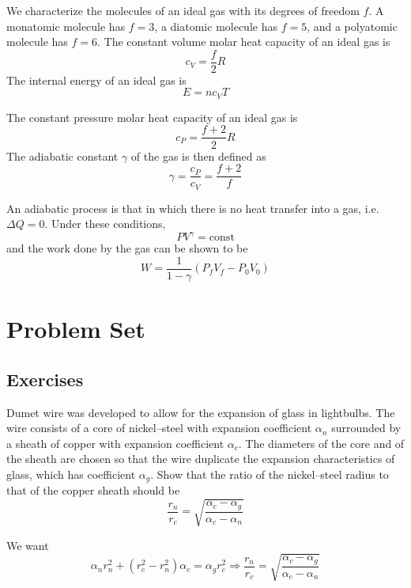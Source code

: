 \documentclass[11pt]{scrartcl}
\begin{document}
\begin{defn}
    We characterize the molecules of an ideal gas with its degrees of freedom $f$. A monatomic molecule has $f=3$, a diatomic molecule has $f=5$, and a polyatomic molecule has $f=6$. The constant volume molar heat capacity of an ideal gas is $$c_V=\frac{f}{2}R$$The internal energy of an ideal gas is $$E=nc_VT$$
\end{defn}

\begin{defn}
    The constant pressure molar heat capacity of an ideal gas is $$c_P=\frac{f+2}{2}R$$The adiabatic constant $\gamma$ of the gas is then defined as $$\gamma=\frac{c_P}{c_V}=\frac{f+2}{f}$$
\end{defn}

\begin{theorem}
    An adiabatic process is that in which there is no heat transfer into a gas, i.e. $\Delta Q=0$. Under these conditions, $$PV^\gamma=\text{const}$$and the work done by the gas can be shown to be $$W=\frac{1}{1-\gamma}(P_fV_f-P_0V_0)$$
\end{theorem}

\section{Problem Set}

\subsection{Exercises}



\begin{prob}[HRK]
    Dumet wire was developed to allow for the expansion of glass in lightbulbs. The wire consists of a core of nickel–steel with expansion coefficient $\alpha_n$ surrounded by a sheath of copper with expansion coefficient $\alpha_c$. The diameters of the core and of the sheath are chosen so that the wire duplicate the expansion characteristics of glass, which has coefficient $\alpha_g$. Show that the ratio of the nickel–steel radius to that of the copper sheath should be $$\frac{r_n}{r_c}=\sqrt{\frac{\alpha_c-\alpha_g}{\alpha_c-\alpha_n}}$$
\end{prob}

\begin{sol}
    We want $$\alpha_nr_n^2+(r_c^2-r_n^2)\alpha_c=\alpha_gr_c^2\Rightarrow \frac{r_n}{r_c}=\boxed{\sqrt{\frac{\alpha_c-\alpha_g}{\alpha_c-\alpha_n}}}$$
\end{sol}
\end{document}
